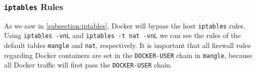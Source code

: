 \subsubsection{\texorpdfstring{\lstinline{iptables}}{iptables} Rules}
As we saw in \autoref{subsection:iptables}, Docker will bypass the host \lstinline{iptables} rules. Using \lstinline{iptables -vnL} and \lstinline{iptables -t nat -vnL} we can see the rules of the default tables \lstinline{mangle} and \lstinline{nat}, respectively. It is important that all firewall rules regarding Docker containers are set in the \lstinline{DOCKER-USER} chain in \lstinline{mangle}, because all Docker traffic will first pass the \lstinline{DOCKER-USER} chain.

